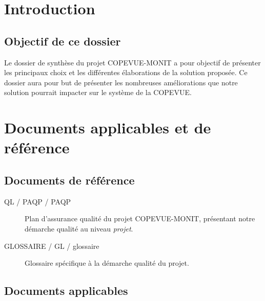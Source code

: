 \documentclass{mise_en_page}
\begin{document}
\maketitle

\begin{historique}
\end{historique}

\newpage

\tableofcontents

\section{Introduction}

\subsection{Objectif de ce dossier}
Le dossier de synthèse du projet COPEVUE-MONIT a pour objectif de présenter les principaux choix et les différentes élaborations de la solution proposée. Ce dossier aura pour but de présenter les nombreuses améliorations que notre solution pourrait impacter sur le système de la COPEVUE.

\section{Documents applicables et de référence}

\subsection{Documents de référence}

\begin{description}
	\item[QL / PAQP / PAQP] Plan d'assurance qualité du projet COPEVUE-MONIT, présentant notre démarche qualité au niveau \emph{projet}.
	\item[GLOSSAIRE / GL / glossaire ] Glossaire spécifique à la démarche qualité du projet.
\end{description}

\subsection{Documents applicables}
\end{document}
